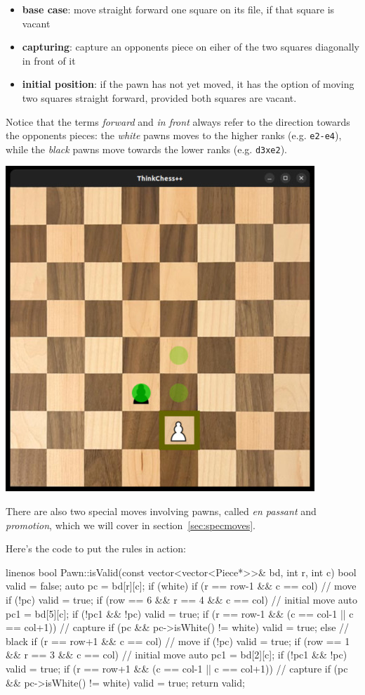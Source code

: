 \begin{itemize}
  \item \textbf{base case}: move straight forward one square on its file, if that square is vacant
  \item \textbf{capturing}: capture an opponents piece on eiher of the two squares diagonally
    in front of it
  \item \textbf{initial position}: if the pawn has not yet moved, it has the option of moving two
    squares straight forward, provided both squares are vacant.
\end{itemize}

Notice that the terms \emph{forward} and \emph{in front} always refer to the direction towards
the opponents pieces: the \emph{white} pawns moves to the higher ranks (e.g. \texttt{e2-e4}),
while the \emph{black} pawns move towards the lower ranks (e.g. \texttt{d3xe2}).

\begin{center}
\includegraphics[width=.5\linewidth]{img/pawn.jpg}
\end{center}

There are also two special moves involving pawns, called \emph{en passant} and \emph{promotion},
which we will cover in section~\ref{sec:specmoves}.

Here's the code to put the rules in action:

\begin{cpp*}{linenos}
bool Pawn::isValid(const vector<vector<Piece*>>& bd, int r, int c) {
  bool valid = false;
  auto pc = bd[r][c];
  if (white) {
    if (r == row-1 && c == col) { // move
      if (!pc) valid = true;
    }
    if (row == 6 && r == 4 && c == col) { // initial move
      auto pc1 = bd[5][c];
      if (!pc1 && !pc) valid = true;
    }
    if (r == row-1 && (c == col-1 || c == col+1)) { // capture
      if (pc && pc->isWhite() != white) valid = true;
    }
  } else { // black
    if (r == row+1 && c == col) { // move
      if (!pc) valid = true;
    }
    if (row == 1 && r == 3 && c == col) { // initial move
      auto pc1 = bd[2][c];
      if (!pc1 && !pc) valid = true;
    }
    if (r == row+1 && (c == col-1 || c == col+1)) { // capture
      if (pc && pc->isWhite() != white) valid = true;
    }
  }
  return valid;
}
\end{cpp*}

